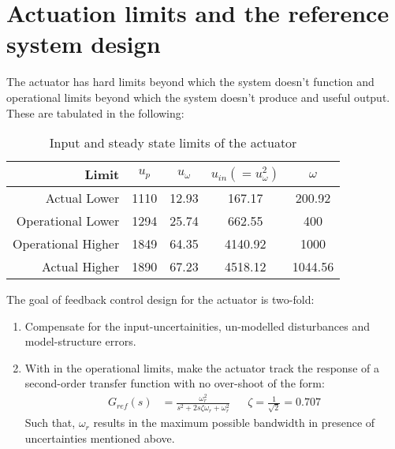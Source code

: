 \section{Actuation limits and the reference system design}
The actuator has hard limits beyond which the system doesn't function and
operational limits beyond which the system doesn't produce and useful output.
These are tabulated in the following:
\begin{table}[H]
    \centering
    \begin{tabular}{r c c c c}
        \hline \hline
        Limit & $u_p$ & $u_{\omega}$ & $u_{in} (=u_\omega^2)$ & $\omega$ \\ \hline \hline
        Actual Lower         & 1110 & 12.93 & 167.17 & 200.92 \\
        Operational Lower    & 1294 & 25.74 &  662.55 & 400 \\
        Operational Higher   & 1849 & 64.35 & 4140.92 & 1000\\
        Actual Higher        & 1890 & 67.23 & 4518.12 &  1044.56\\
        \hline \hline
    \end{tabular}
    \caption{Input and steady state limits of the actuator}
\end{table}


\noindent The goal of feedback control design for the actuator is two-fold:
\begin{enumerate}
\item Compensate for the input-uncertainities, un-modelled disturbances and
model-structure errors.
\item With in the operational limits, make the actuator track the response of a second-order transfer function
with no over-shoot of the form:
\begin{align*}
    G_{ref}(s) &= \frac{\omega_{r}^2}{s^2 + 2s \zeta \omega_{r} + \omega_{r}^2}
    && \zeta = \frac{1}{\sqrt{2}} = 0.707
\end{align*}
Such that, $\omega_{r}$ results in the maximum possible bandwidth in presence
of uncertainties mentioned above.
\end{enumerate}

